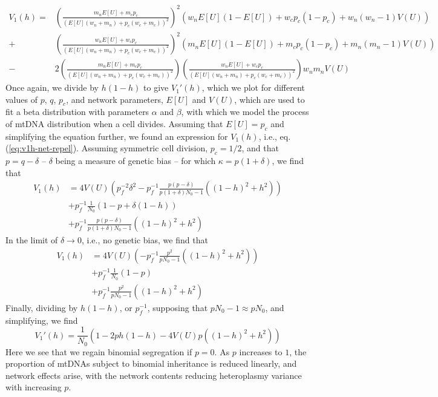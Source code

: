 \documentclass{article}
\begin{document}
\begin{appendices}
\begin{equation}
    \begin{split}
    V_1(h)= &\left(\frac{m_nE[U]+m_cp_c}{(E[U](w_n+m_n)+p_c(w_c+m_c))^2}\right)^2
       \left(w_nE[U](1-E[U])+w_cp_c(1-p_c)+w_n(w_n-1)V(U)\right)\\
      +&\left(\frac{w_nE[U]+w_cp_c}{(E[U](w_n+m_n)+p_c(w_c+m_c))^2}\right)^2
       (m_nE[U](1-E[U])+m_cp_c(1-p_c)+m_n(m_n-1)V(U))\\
      -&2\left(\frac{m_nE[U]+m_cp_c}{(E[U](w_n+m_n)+p_c(w_c+m_c))^2}\right)\left(\frac{w_nE[U]+w_cp_c}{(E[U](w_n+m_n)+p_c(w_c+m_c))^2}\right)w_nm_nV(U)
    \end{split}
\end{equation}
Once again, we divide by $h(1-h)$ to give $V_1'(h)$, which we plot for different values of $p$, $q$, $p_c$, and network parameters, $E[U]$ and $V(U)$, which are used to fit a beta distribution with parameters $\alpha$ and $\beta$, with which we model the process of mtDNA distribution when a cell divides. Assuming that $E[U]=p_c$ and simplifying the equation further, we found an expression for $V_1(h)$, i.e., eq. (\ref{eq:v1h-net-repel}).
Assuming symmetric cell division, $p_c=1/2$, and that $p=q-\delta$ -- $\delta$ being a measure of genetic bias -- for which $\kappa = p(1+\delta)$, we find that
\begin{equation}
    \begin{split}
      V_1(h) & = 4V(U)\left(p_f^{-2}\delta^2-p_f^{-1}\frac{p(p-\delta)}{p(1+\delta)N_0-1}((1-h)^2+h^2)\right)\\
      & + p_f^{-1}\frac{1}{N_0}\left(1-p+\delta(1-h)\right)\\
      & + p_f^{-1}\frac{p(p-\delta)}{p(1+\delta)N_0-1}\left((1-h)^2+h^2\right)
    \end{split}
\end{equation}
In the limit of $\delta\rightarrow 0$, i.e., no genetic bias, we find that
\begin{equation}
    \begin{split}
      V_1(h) & = 4V(U)\left(-p_f^{-1}\frac{p^2}{pN_0-1}((1-h)^2+h^2)\right)\\
      & + p_f^{-1}\frac{1}{N_0}\left(1-p\right)\\
      & + p_f^{-1}\frac{p^2}{pN_0-1}\left((1-h)^2+h^2\right)
    \end{split}
\end{equation}
Finally, dividing by $h(1-h)$, or $p_f^{-1}$, supposing that $pN_0-1\approx pN_0$, and simplifying, we find
\begin{equation}
      V_1'(h) = \frac{1}{N_0}\left(1-2ph(1-h)-4V(U)p((1-h)^2+h^2)\right)
\end{equation}
Here we see that we regain binomial segregation if $p=0$. As $p$ increases to $1$, the proportion of mtDNAs subject to binomial inheritance is reduced linearly, and network effects arise, with the network contents reducing heteroplasmy variance with increasing $p$.


\end{appendices}
\end{document}
